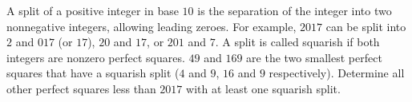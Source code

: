 A split of a positive integer in base $10$ is the separation of the integer into two nonnegative integers, allowing leading zeroes. For example, $2017$ can be split into $2$ and $017$ (or $17$), $20$ and $17$, or $201$ and $7$. A split is called squarish if both integers are nonzero perfect squares. $49$ and $169$ are the two smallest  perfect squares that have a squarish split ($4$ and $9$, $16$ and $9$ respectively). Determine all other perfect squares less than $2017$ with at least one squarish split.

